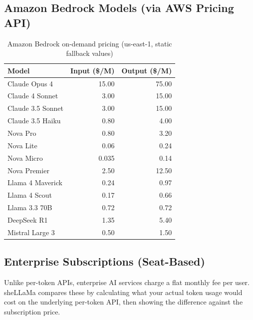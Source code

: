 \documentclass[11pt,a4paper]{article}
\begin{document}
\subsection{Amazon Bedrock Models (via AWS Pricing API)}

\begin{table}[H]
\centering
\begin{tabular}{lrr}
\toprule
\textbf{Model} & \textbf{Input (\$/M)} & \textbf{Output (\$/M)} \\
\midrule
Claude Opus 4 & 15.00 & 75.00 \\
Claude 4 Sonnet & 3.00 & 15.00 \\
Claude 3.5 Sonnet & 3.00 & 15.00 \\
Claude 3.5 Haiku & 0.80 & 4.00 \\
Nova Pro & 0.80 & 3.20 \\
Nova Lite & 0.06 & 0.24 \\
Nova Micro & 0.035 & 0.14 \\
Nova Premier & 2.50 & 12.50 \\
Llama 4 Maverick & 0.24 & 0.97 \\
Llama 4 Scout & 0.17 & 0.66 \\
Llama 3.3 70B & 0.72 & 0.72 \\
DeepSeek R1 & 1.35 & 5.40 \\
Mistral Large 3 & 0.50 & 1.50 \\
\bottomrule
\end{tabular}
\caption{Amazon Bedrock on-demand pricing (us-east-1, static fallback values)}
\end{table}

\subsection{Enterprise Subscriptions (Seat-Based)}

Unlike per-token APIs, enterprise AI services charge a flat monthly fee per user. sheLLaMa compares these by calculating what your actual token usage would cost on the underlying per-token API, then showing the difference against the subscription price.
\end{document}
